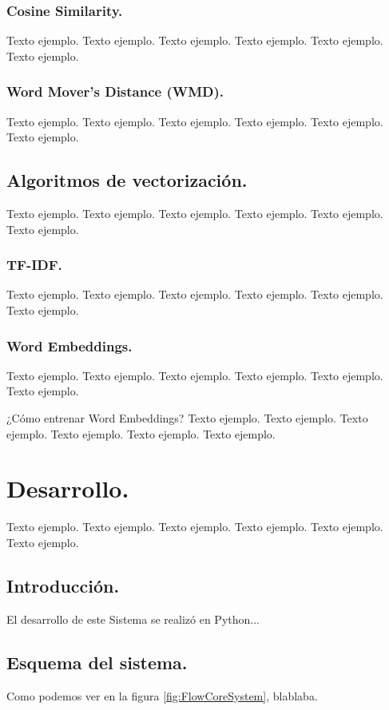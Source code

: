 \documentclass[12pt,a4paper]{article}
\makeatletter
\renewcommand\paragraph{\@startsection{paragraph}{4}{\z@}
            {-2.5ex\@plus -1ex \@minus -.25ex}
            {1.25ex \@plus .25ex}
            {\normalfont\normalsize\bfseries}}
\makeatother
\begin{document}
\subsubsection{Cosine Similarity.}
Texto ejemplo. Texto ejemplo. Texto ejemplo. Texto ejemplo. Texto ejemplo. Texto ejemplo.

\subsubsection{Word Mover's Distance (WMD).}
Texto ejemplo. Texto ejemplo. Texto ejemplo. Texto ejemplo. Texto ejemplo. Texto ejemplo.

\subsection{Algoritmos de vectorización.}
Texto ejemplo. Texto ejemplo. Texto ejemplo. Texto ejemplo. Texto ejemplo. Texto ejemplo.

\subsubsection{TF-IDF.}
Texto ejemplo. Texto ejemplo. Texto ejemplo. Texto ejemplo. Texto ejemplo. Texto ejemplo.

\subsubsection{Word Embeddings.}
Texto ejemplo. Texto ejemplo. Texto ejemplo. Texto ejemplo. Texto ejemplo. Texto ejemplo.

\paragraph{¿Cómo entrenar Word Embeddings?}
Texto ejemplo. Texto ejemplo. Texto ejemplo. Texto ejemplo. Texto ejemplo. Texto ejemplo.

\section{Desarrollo.}
Texto ejemplo. Texto ejemplo. Texto ejemplo. Texto ejemplo. Texto ejemplo. Texto ejemplo.

\subsection{Introducción.}
El desarrollo de este Sistema se realizó en Python...

\subsection{Esquema del sistema.}
Como podemos ver en la figura \ref{fig:FlowCoreSystem}, blablaba. \\
\end{document}
